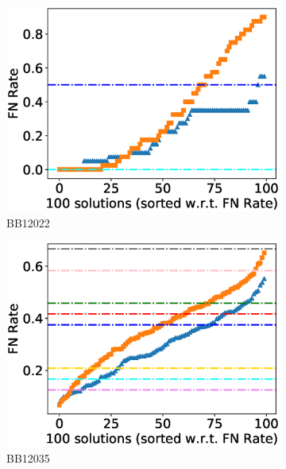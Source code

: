 \begin{figure}[!htbp]
\begin{adjustwidth}{-1cm}{-1cm}
		\begin{subfigure}{0.22\textwidth}
			\includegraphics[width=\columnwidth]{Figure/summary/precomputedInit/Balibase/BB12022_fnrate_density_single_run}
			\caption{BB12022}
		\end{subfigure}
		\begin{subfigure}{0.22\textwidth}
			\includegraphics[width=\columnwidth]{Figure/summary/precomputedInit/Balibase/BB12035_fnrate_density_single_run}
			\caption{BB12035}
		\end{subfigure}
		\begin{subfigure}{0.22\textwidth}

\end{subfigure}
\end{adjustwidth}
\end{figure}

